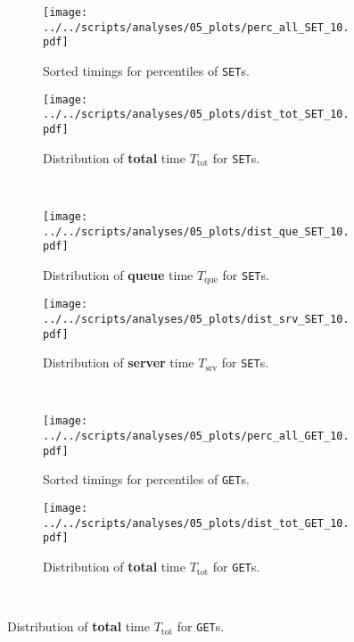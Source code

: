 \documentclass[11pt]{article}
\theoremstyle{definition}
\newcommand\Ttot{T_{\mathrm{tot}}}
\newcommand\Tque{T_{\mathrm{que}}}
\newcommand\Tsrv{T_{\mathrm{srv}}}
\renewcommand\b[1]{{\bf{#1}}}
\renewcommand\t\texttt
\begin{document}
\begin{figure}[!h]
    \newcommand\wdt{7.4cm}
    \centering
    \begin{subfigure}[t]{\wdt}
        \centering
        \texttt{[image: ../../scripts/analyses/05\_plots/perc\_all\_SET\_10.pdf]}
        \caption{Sorted timings for percentiles of \t{SET}s.}\label{fig:05_breakdown-srt-set-10}
    \end{subfigure}
    \hspace{0.2cm}
    \begin{subfigure}[t]{\wdt}
        \centering
        \texttt{[image: ../../scripts/analyses/05\_plots/dist\_tot\_SET\_10.pdf]}
        \caption{Distribution of \b{total} time $\Ttot$ for \t{SET}s.}\label{fig:05_breakdown-tot-set-10}
    \end{subfigure}
    \\\vspace{3mm}
    \begin{subfigure}[t]{\wdt}
        \centering
        \texttt{[image: ../../scripts/analyses/05\_plots/dist\_que\_SET\_10.pdf]}
        \caption{Distribution of \b{queue} time $\Tque$ for \t{SET}s.}\label{fig:05_breakdown-que-set-10}
    \end{subfigure}
    \hspace{0.2cm}
    \begin{subfigure}[t]{\wdt}
        \centering
        \texttt{[image: ../../scripts/analyses/05\_plots/dist\_srv\_SET\_10.pdf]}
        \caption{Distribution of \b{server} time $\Tsrv$ for \t{SET}s.}\label{fig:05_breakdown-srv-set-10}
    \end{subfigure}
    \\\vspace{3mm}
    \begin{subfigure}[t]{\wdt}
        \centering
        \texttt{[image: ../../scripts/analyses/05\_plots/perc\_all\_GET\_10.pdf]}
        \caption{Sorted timings for percentiles of \t{GET}s.}\label{fig:05_breakdown-srt-get-10}
    \end{subfigure}
    \hspace{0.2cm}
    \begin{subfigure}[t]{\wdt}
        \centering
        \texttt{[image: ../../scripts/analyses/05\_plots/dist\_tot\_GET\_10.pdf]}
        \caption{Distribution of \b{total} time $\Ttot$ for \t{GET}s.}\label{fig:05_breakdown-tot-get-10}
    \end{subfigure}
    \\\vspace{3mm}

\end{figure}
\end{document}

